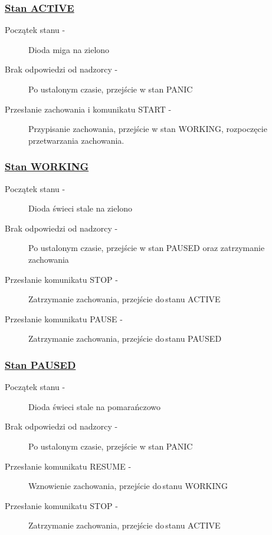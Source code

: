 \subsubsection{\underline{Stan ACTIVE}}

\begin{description}
    \item[Początek stanu -]Dioda miga na zielono
    \item[Brak odpowiedzi od nadzorcy -]Po ustalonym czasie, przejście w stan PANIC
        
    \item[Przesłanie zachowania i komunikatu START -]Przypisanie zachowania, przejście w stan WORKING, rozpoczęcie przetwarzania zachowania.
        
\end{description}

\subsubsection{\underline{Stan WORKING}}

\begin{description}
    \item[Początek stanu -]Dioda świeci stale na zielono
    \item[Brak odpowiedzi od nadzorcy -]Po ustalonym czasie, przejście w stan PAUSED oraz zatrzymanie zachowania
        
    \item[Przesłanie komunikatu STOP -]Zatrzymanie zachowania, przejście do\,stanu ACTIVE
        
    \item[Przesłanie komunikatu PAUSE -]Zatrzymanie zachowania, przejście do\,stanu PAUSED
        
\end{description}

\subsubsection{\underline{Stan PAUSED}}

\begin{description}
    \item[Początek stanu -]Dioda świeci stale na pomarańczowo
    \item[Brak odpowiedzi od nadzorcy -]Po ustalonym czasie, przejście w stan PANIC
        
    \item[Przesłanie komunikatu RESUME -]Wznowienie zachowania, przejście do\,stanu WORKING
        
    \item[Przesłanie komunikatu STOP -]Zatrzymanie zachowania, przejście do\,stanu ACTIVE
        
\end{description}


